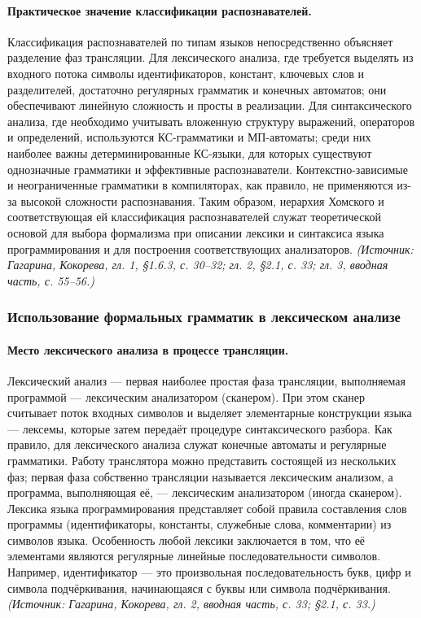 \documentclass[a4paper,12pt]{article}
\begin{document}
\paragraph{Практическое значение классификации распознавателей.}
Классификация распознавателей по типам языков непосредственно объясняет разделение фаз трансляции. Для лексического анализа, где требуется выделять из входного потока символы идентификаторов, констант, ключевых слов и разделителей, достаточно регулярных грамматик и конечных автоматов; они обеспечивают линейную сложность и просты в реализации. Для синтаксического анализа, где необходимо учитывать вложенную структуру выражений, операторов и определений, используются КС-грамматики и МП-автоматы; среди них наиболее важны детерминированные КС-языки, для которых существуют однозначные грамматики и эффективные распознаватели. Контекстно-зависимые и неограниченные грамматики в компиляторах, как правило, не применяются из-за высокой сложности распознавания. Таким образом, иерархия Хомского и соответствующая ей классификация распознавателей служат теоретической основой для выбора формализма при описании лексики и синтаксиса языка программирования и для построения соответствующих анализаторов.
\textit{(Источник: Гагарина, Кокорева, гл. 1, §1.6.3, с. 30--32; гл. 2, §2.1, с. 33; гл. 3, вводная часть, с. 55--56.)}

\subsubsection{Использование формальных грамматик в лексическом анализе}

\paragraph{Место лексического анализа в процессе трансляции.}
Лексический анализ — первая наиболее простая фаза трансляции, выполняемая программой — лексическим анализатором (сканером). При этом сканер считывает поток входных символов и выделяет элементарные конструкции языка — лексемы, которые затем передаёт процедуре синтаксического разбора. Как правило, для лексического анализа служат конечные автоматы и регулярные грамматики. Работу транслятора можно представить состоящей из нескольких фаз; первая фаза собственно трансляции называется лексическим анализом, а программа, выполняющая её, — лексическим анализатором (иногда сканером). Лексика языка программирования представляет собой правила составления слов программы (идентификаторы, константы, служебные слова, комментарии) из символов языка. Особенность любой лексики заключается в том, что её элементами являются регулярные линейные последовательности символов. Например, идентификатор — это произвольная последовательность букв, цифр и символа подчёркивания, начинающаяся с буквы или символа подчёркивания.
\textit{(Источник: Гагарина, Кокорева, гл. 2, вводная часть, с. 33; §2.1, с. 33.)}
\end{document}
